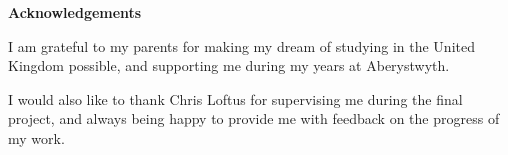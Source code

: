 \thispagestyle{empty}

\begin{center}
    {\LARGE\bf Acknowledgements}
\end{center}

I am grateful to my parents for making my dream of studying in the United Kingdom
possible, and supporting me during my years at Aberystwyth.

I would also like to thank Chris Loftus for supervising me during the final
project, and always being happy to provide me with feedback on the progress of my
work.
